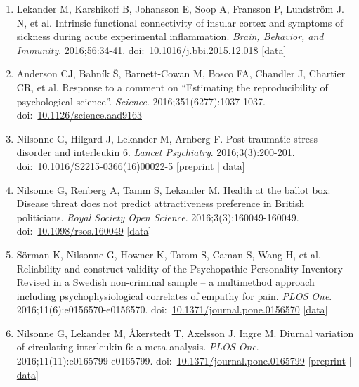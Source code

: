 \documentclass[10pt,a4paper,twocolumn]{article}
\begin{document}
\begin{enumerate}
    \item Lekander M, Karshikoff B, Johansson E, Soop A, Fransson P, Lundström J. N, et al. Intrinsic functional connectivity of insular cortex and symptoms of sickness during acute experimental inflammation. \textit{Brain, Behavior, and Immunity}. 2016;56:34-41. doi:~\href{https://doi.org/10.1016/j.bbi.2015.12.018}{10.1016/j.bbi.2015.12.018} [\href{http://dx.doi.org/10.5281/zenodo.35770}{data}]

    \item Anderson CJ, Bahník Š, Barnett-Cowan M, Bosco FA, Chandler J, Chartier CR, et al. Response to a comment on “Estimating the reproducibility of psychological science”. \textit{Science}. 2016;351(6277):1037-1037. doi:~\href{https://doi.org/10.1126/science.aad9163}{10.1126/science.aad9163}

    \item Nilsonne G, Hilgard J, Lekander M, Arnberg F. Post-traumatic stress disorder and interleukin 6. \textit{Lancet Psychiatry}. 2016;3(3):200-201. doi:~\href{https://doi.org/10.1016/S2215-0366(16)00022-5}{10.1016/S2215-0366(16)00022-5} [\href{http://hdl.handle.net/10616/44992}{preprint} | \href{http://dx.doi.org/10.5281/zenodo.44726}{data}]

    \item Nilsonne G, Renberg A, Tamm S, Lekander M. Health at the ballot box: Disease threat does not predict attractiveness preference in British politicians. \textit{Royal Society Open Science}. 2016;3(3):160049-160049. doi:~\href{https://doi.org/10.1098/rsos.160049}{10.1098/rsos.160049} [\href{http://dx.doi.org/10.5281/zenodo.12984}{data}]

    \item Sörman K, Nilsonne G, Howner K, Tamm S, Caman S, Wang H, et al. Reliability and construct validity of the Psychopathic Personality Inventory-Revised in a Swedish non-criminal sample – a multimethod approach including psychophysiological correlates of empathy for pain. \textit{PLOS One}. 2016;11(6):e0156570-e0156570. doi:~\href{https://doi.org/10.1371/journal.pone.0156570}{10.1371/journal.pone.0156570} [\href{http://dx.doi.org/10.5061/dryad.qh8c9}{data}]

    \item Nilsonne G, Lekander M, Åkerstedt T, Axelsson J, Ingre M. Diurnal variation of circulating interleukin-6: a meta-analysis. \textit{PLOS One}. 2016;11(11):e0165799-e0165799. doi:~\href{https://doi.org/10.1371/journal.pone.0165799}{10.1371/journal.pone.0165799} [\href{http://dx.doi.org/10.1101/042507}{preprint} | \href{http://dx.doi.org/10.5281/zenodo.163325}{data}]


\end{enumerate}
\end{document}
